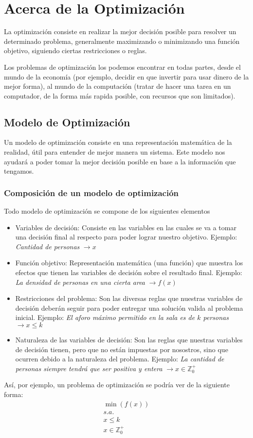 \documentclass[../main.tex]{subfiles}
\begin{document}
\section{Acerca de la Optimización}

La optimización consiste en realizar la mejor decisión posible para resolver un determinado problema, generalmente maximizando o minimizando una función objetivo, siguiendo ciertas restricciones o reglas.

Los problemas de optimización los podemos encontrar en todas partes, desde el mundo de la economía (por ejemplo, decidir en que invertir para usar dinero de la mejor forma), al mundo de la computación (tratar de hacer una tarea en un computador, de la forma más rapida posible, con recursos que son limitados).

\subsection{Modelo de Optimización}
Un modelo de optimización consiste en una representación matemática de la realidad, útil para entender de mejor manera un sistema. Este modelo nos ayudará a poder tomar la mejor decisión posible en base a la información que tengamos.

\subsubsection{Composición de un modelo de optimización}
Todo modelo de optimización se compone de los siguientes elementos
\begin{itemize}
  \item Variables de decisión: Consiste en las variables en las cuales se va a tomar una decisión final al respecto para poder lograr nuestro objetivo. Ejemplo: \textit{Cantidad de personas} $\rightarrow x$
  \item Función objetivo: Representación matemática (una función) que muestra los efectos que tienen las variables de decisión sobre el resultado final. Ejemplo: \textit{La densidad de personas en una cierta area} $\rightarrow f(x)$
  \item Restricciones del problema: Son las diversas reglas que nuestras variables de decisión deberán seguir para poder entregar una solución valida al problema inicial. Ejemplo: \textit{El aforo máximo permitido en la sala es de $k$ personas} $\rightarrow x \leq k$
  \item Naturaleza de las variables de decisión: Son las reglas que nuestras variables de decisión tienen, pero que no están impuestas por nosostros, sino que ocurren debido a la naturaleza del problema. Ejemplo: \textit{La cantidad de personas siempre tendrá que ser positiva y entera} $\rightarrow x \in \mathbb{Z}^+_0$
\end{itemize}

Así, por ejemplo, un problema de optimización se podría ver de la siguiente forma:
\[
  \boxed{
    \begin{gathered}
      \min(f(x))\\
      s.a.\\
      x \leq k\\
      x \in \mathbb{Z}^+_0
    \end{gathered}
  }
\]
\end{document}
